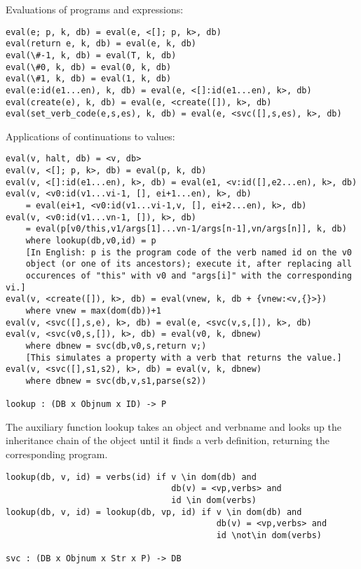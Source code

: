 \documentclass{article}
\begin{document}
Evaluations of programs and expressions:

\begin{verbatim}
eval(e; p, k, db) = eval(e, <[]; p, k>, db)
eval(return e, k, db) = eval(e, k, db)
eval(\#-1, k, db) = eval(T, k, db)
eval(\#0, k, db) = eval(0, k, db)
eval(\#1, k, db) = eval(1, k, db)
eval(e:id(e1...en), k, db) = eval(e, <[]:id(e1...en), k>, db)
eval(create(e), k, db) = eval(e, <create([]), k>, db)
eval(set_verb_code(e,s,es), k, db) = eval(e, <svc([],s,es), k>, db)
\end{verbatim}

Applications of continuations to values:

\begin{verbatim}
eval(v, halt, db) = <v, db>
eval(v, <[]; p, k>, db) = eval(p, k, db)
eval(v, <[]:id(e1...en), k>, db) = eval(e1, <v:id([],e2...en), k>, db)
eval(v, <v0:id(v1...vi-1, [], ei+1...en), k>, db)
    = eval(ei+1, <v0:id(v1...vi-1,v, [], ei+2...en), k>, db)
eval(v, <v0:id(v1...vn-1, []), k>, db)
    = eval(p[v0/this,v1/args[1]...vn-1/args[n-1],vn/args[n]], k, db)
    where lookup(db,v0,id) = p
    [In English: p is the program code of the verb named id on the v0
    object (or one of its ancestors); execute it, after replacing all
    occurences of "this" with v0 and "args[i]" with the corresponding vi.]
eval(v, <create([]), k>, db) = eval(vnew, k, db + {vnew:<v,{}>})
    where vnew = max(dom(db))+1
eval(v, <svc([],s,e), k>, db) = eval(e, <svc(v,s,[]), k>, db)
eval(v, <svc(v0,s,[]), k>, db) = eval(v0, k, dbnew)
    where dbnew = svc(db,v0,s,return v;)
    [This simulates a property with a verb that returns the value.]
eval(v, <svc([],s1,s2), k>, db) = eval(v, k, dbnew)
    where dbnew = svc(db,v,s1,parse(s2))

lookup : (DB x Objnum x ID) -> P
\end{verbatim}

The auxiliary function lookup takes an object and verbname and looks
up the inheritance chain of the object until it finds a verb
definition, returning the corresponding program.

\begin{verbatim}
lookup(db, v, id) = verbs(id) if v \in dom(db) and
                                 db(v) = <vp,verbs> and
                                 id \in dom(verbs)
lookup(db, v, id) = lookup(db, vp, id) if v \in dom(db) and
                                          db(v) = <vp,verbs> and
                                          id \not\in dom(verbs)

svc : (DB x Objnum x Str x P) -> DB
\end{verbatim}
\end{document}
